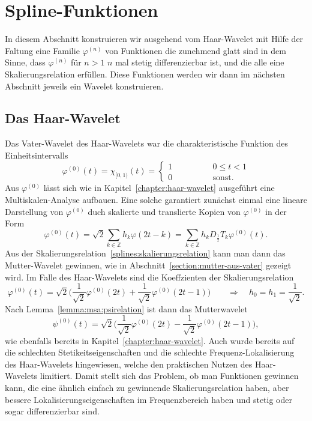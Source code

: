 %
%
%
\section{Spline-Funktionen
\label{section:spline-funktionen}}
In diesem Abschnitt konstruieren wir ausgehend vom Haar-Wavelet mit Hilfe
der Faltung eine Familie $\varphi^{(n)}$ von Funktionen die zunehmend glatt
sind in dem Sinne, dass $\varphi^{(n)}$ für $n>1$ $n$ mal stetig
differenzierbar ist, und die alle eine Skalierungsrelation erfüllen.
Diese Funktionen werden wir dann im nächsten Abschnitt jeweils ein
Wavelet konstruieren.

\subsection{Das Haar-Wavelet
\label{subsection:spline:haar}}
Das Vater-Wavelet des Haar-Wavelets war die charakteristische Funktion
des Einheitsintervalls
\begin{equation}
\varphi^{(0)}(t)
=
\chi_{[0,1)}(t)
=
\begin{cases}
1\qquad\qquad&0\le t < 1\\
0\qquad\qquad&\text{sonst}.
\end{cases}
\end{equation}
Aus $\varphi^{(0)}$ lässt sich wie in Kapitel~\ref{chapter:haar-wavelet}
ausgeführt eine Multiskalen-Analyse aufbauen.
Eine solche garantiert zunächst einmal eine lineare Darstellung von
$\varphi^{(0)}$ duch skalierte und translierte Kopien von $\varphi^{(0)}$
in der Form
\begin{equation}
\varphi^{(0)}(t)
=
\sqrt{2}
\sum_{k\in\mathbb Z}
h_k\varphi(2t-k)
=
\sum_{k\in\mathbb Z}
h_k D_{\frac12}T_k\varphi^{(0)}(t).
\label{splines:skalierungsrelation}
\end{equation}
Aus der Skalierungsrelation~\eqref{splines:skalierungsrelation}
kann man dann das Mutter-Wavelet gewinnen, wie in
Abschnitt~\ref{section:mutter-aus-vater} gezeigt wird.
Im Falle des Haar-Wavelets sind die Koeffzienten der
Skalierungsrelation
\[
\varphi^{(0)}(t)
=
\sqrt{2}
\biggl(
\frac1{\sqrt{2}}
\varphi^{(0)}(2t)
+
\frac1{\sqrt{2}}
\varphi^{(0)}(2t-1)
\biggr)
\qquad
\Rightarrow
\quad
h_0 = h_1 = \frac{1}{\sqrt{2}}.
\]
Nach Lemma~\ref{lemma:msa:psirelation} ist dann das Mutterwavelet
\[
\psi^{(0)}(t)
=
\sqrt{2}
\biggl(
\frac{1}{\sqrt{2}}
\varphi^{(0)}(2t)
-
\frac{1}{\sqrt{2}}
\varphi^{(0)}(2t-1)
\biggr),
\]
wie ebenfalls bereits in Kapitel~\ref{chapter:haar-wavelet}.
Auch wurde bereits auf die schlechten Stetikeitseigenschaften und
die schlechte Frequenz-Lokalisierung des Haar-Wavelets hingewiesen,
welche den praktischen Nutzen des Haar-Wavelets limitiert.
Damit stellt sich das Problem, ob man Funktionen gewinnen kann, die
eine ähnlich einfach zu gewinnende Skalierungsrelation haben,
aber bessere Lokalisierungseigenschaften im Frequenzbereich haben und
stetig oder sogar differenzierbar sind.

